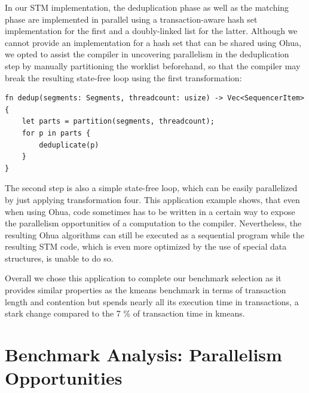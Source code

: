 In our STM implementation, the deduplication phase as well as the matching phase are implemented in parallel using a transaction-aware hash set implementation for the first and a doubly-linked list for the latter.
Although we cannot provide an implementation for a hash set that can be shared using Ohua, we opted to assist the compiler in uncovering parallelism in the deduplication step by manually partitioning the worklist beforehand, so that the compiler may break the resulting state-free loop using the first transformation:
\begin{verbatim}
fn dedup(segments: Segments, threadcount: usize) -> Vec<SequencerItem> {
    let parts = partition(segments, threadcount);
    for p in parts {
        deduplicate(p)
    }
}
\end{verbatim}
The second step is also a simple state-free loop, which can be easily parallelized by just applying transformation four.
This application example shows, that even when using Ohua, code sometimes has to be written in a certain way to expose the parallelism opportunities of a computation to the compiler.
Nevertheless, the resulting Ohua algorithms can still be executed as a sequential program while the resulting STM code, which is even more optimized by the use of special data structures, is unable to do so.

Overall we chose this application to complete our benchmark selection as it provides similar properties as the kmeans benchmark in terms of transaction length and contention but spends nearly all its execution time in transactions, a stark change compared to the 7 \% of transaction time in kmeans.


\section{Benchmark Analysis: Parallelism Opportunities}
\label{sec:experiments:opportunities}


